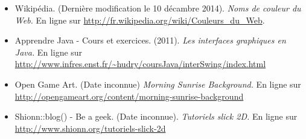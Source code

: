 \documentclass[a4paper,titlepage]{article}
\begin{document}
\begin{itemize}
{boutons}
	\item Wikipédia. (Dernière modification le 10 décambre 2014). \textit{Noms de couleur du Web.} En ligne sur \url{http://fr.wikipedia.org/wiki/Couleurs_du_Web}.
	\item Apprendre Java - Cours et exercices. (2011). \textit{Les interfaces graphiques en Java.} En ligne sur \url{http://www.infres.enst.fr/~hudry/coursJava/interSwing/index.html}
	\item Open Game Art. (Date inconnue) \textit{Morning Sunrise Background.} En ligne sur \url{http://opengameart.org/content/morning-sunrise-background}
	\item Shionn::blog() - Be a geek. (Date inconnue). \textit{Tutoriels slick 2D.} En ligne sur \url{http://www.shionn.org/tutoriels-slick-2d}
\end{itemize}
	
	\clearpage	
	
\end{document}
